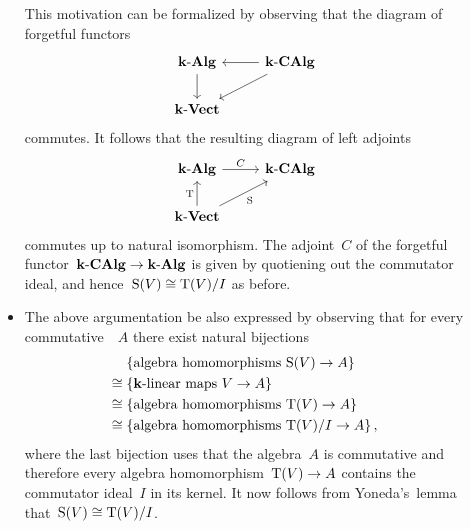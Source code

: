 \begin{recall}
\begin{description}
\begin{itemize}
          This motivation can be formalized by observing that the diagram of forgetful functors
          \[
            \begin{tikzcd}
              \cAlg{\kf}
              \arrow{d}
              &
              \cCAlg{\kf}
              \arrow{l}
              \arrow{dl}
              \\
              \cVect{\kf}
              &
              {}
            \end{tikzcd}
          \]
          commutes.
          It follows that the resulting diagram of left adjoints
          \[
            \begin{tikzcd}
              \cAlg{\kf}
              \arrow{r}[above]{C}
              &
              \cCAlg{\kf}
              \\
              \cVect{\kf}
              \arrow{u}[left]{\Tensor}
              \arrow{ur}[below right]{\Symm}
              &
              {}
            \end{tikzcd}
          \]
          commutes up to natural isomorphism.
          The adjoint~$C$ of the forgetful functor~$\mathbf{k}\text{-}\mathbf{CAlg} \to \mathbf{k}\text{-}\mathbf{Alg}$ is given by quotiening out the commutator ideal, and hence~$\operatorname{S}(V) \cong \operatorname{T}(V)/I$ as before.
        \item
          The above argumentation be also expressed by observing that for every commutative~{\algebra{$\kf$}}~$A$ there exist natural bijections
          \begin{align*}
            {}&
            \{ \text{algebra homomorphisms~$\Symm(V) \to A$} \}
            \\
            \cong{}&
            \{ \text{{\linear{$\kf$}} maps~$V \to A$} \}
            \\
            \cong{}&
            \{ \text{algebra homomorphisms~$\Tensor(V) \to A$} \}
            \\
            \cong{}&
            \{ \text{algebra homomorphisms~$\Tensor(V)/I \to A$} \} \,,
          \end{align*}
          where the last bijection uses that the algebra~$A$ is commutative and therefore every algebra homomorphism~$\operatorname{T}(V) \to A$ contains the commutator ideal~$I$ in its kernel.
          It now follows from Yoneda’s~lemma that~$\operatorname{S}(V) \cong \operatorname{T}(V)/I$.
      \end{itemize}
  \end{description}
\end{recall}


